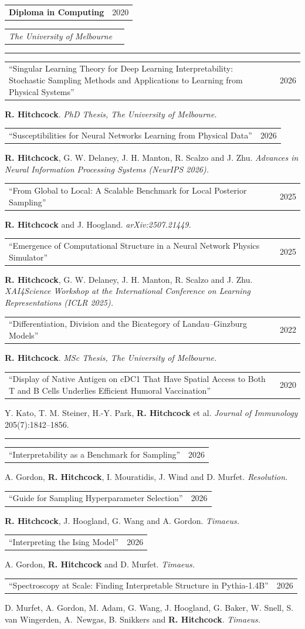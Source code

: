 \documentclass[11pt]{article}
\makeatletter
\newcommand{\resumesection}[1]{\par\needspace{5\baselineskip}\vspace{8pt}{\large\bfseries #1}\par\vspace{3pt}\hrule \vspace{5.5pt}}
\newcommand{\leftright}[2]
{\begin{tabularx}{\linewidth}{l@{\extracolsep{\fill}}r}
	#1 &
	#2 \\
\end{tabularx}}
\newcommand{\work}[3]{%
  \begin{tabularx}{\linewidth}{@{}>{\raggedright\arraybackslash}X@{\hspace{1.5em}}r@{}}
    ``#1'' & #2 \\
  \end{tabularx}\par
  {\raggedright #3\par}\medskip}
\makeatother
\begin{document}
        \leftright{\textbf{Diploma in Computing}}{2020}
        \leftright{\textit{The University of Melbourne}}{}

    \resumesection{Publications}

        \work{Singular Learning Theory for Deep Learning Interpretability: Stochastic Sampling Methods and Applications to Learning from Physical Systems}{2026}
        {\textbf{R. Hitchcock}. \textit{PhD Thesis, The University of Melbourne.}}

        \work{Susceptibilities for Neural Networks Learning from Physical Data}{2026}
        {\textbf{R. Hitchcock}, G. W. Delaney, J. H. Manton, R. Scalzo and J. Zhu.
        \textit{Advances in Neural Information Processing Systems (NeurIPS 2026).}}

        \work{From Global to Local: A Scalable Benchmark for Local Posterior Sampling}{2025}
        {\textbf{R. Hitchcock} and J. Hoogland. \textit{arXiv:2507.21449.}}

        \work{Emergence of Computational Structure in a Neural Network Physics Simulator}{2025}
        {\textbf{R. Hitchcock}, G. W. Delaney, J. H. Manton, R. Scalzo and J. Zhu.
        \textit{XAI4Science Workshop at the International Conference on Learning
        Representations (ICLR 2025).}}

        \work{Differentiation, Division and the Bicategory of Landau--Ginzburg Models}{2022}
        {\textbf{R. Hitchcock}. \textit{MSc Thesis, The University of Melbourne.}}

        \work{Display of Native Antigen on cDC1 That Have Spatial Access to Both T and B Cells Underlies Efficient Humoral Vaccination}{2020}
        {Y. Kato, T. M. Steiner, H.-Y. Park, \textbf{R. Hitchcock} et al.
        \textit{Journal of Immunology} 205(7):1842--1856.}

    \resumesection{Research Notes}

        \work{Interpretability as a Benchmark for Sampling}{2026}
        {A. Gordon, \textbf{R. Hitchcock}, I. Mouratidis, J. Wind and D. Murfet. \textit{Resolution.}}

        \work{Guide for Sampling Hyperparameter Selection}{2026}
        {\textbf{R. Hitchcock}, J. Hoogland, G. Wang and A. Gordon. \textit{Timaeus.}}

        \work{Interpreting the Ising Model}{2026}
        {A. Gordon, \textbf{R. Hitchcock} and D. Murfet. \textit{Timaeus.}}

        \work{Spectroscopy at Scale: Finding Interpretable Structure in Pythia-1.4B}{2026}
        {D. Murfet, A. Gordon, M. Adam, G. Wang, J. Hoogland, G. Baker, W. Snell,
        S. van Wingerden, A.~Newgas, B. Snikkers and \textbf{R. Hitchcock}. \textit{Timaeus.}}
\end{document}
